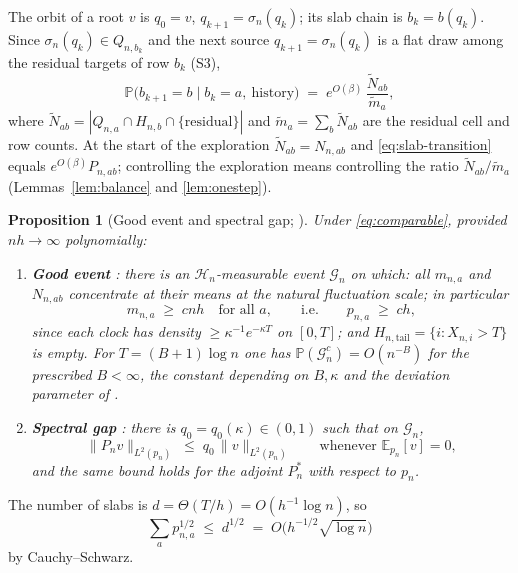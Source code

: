 \documentclass[11pt]{article}
\newcommand{\E}{\mathbb{E}}
\newcommand{\Prob}{\mathbb{P}}
\newcommand{\1}{\mathbf{1}}
\newcommand{\cG}{\mathcal{G}}
\newcommand{\cH}{\mathcal{H}}
\newtheorem{proposition}[theorem]{Proposition}
\theoremstyle{remark}
\begin{document}
The orbit of a root $v$ is $q_0=v$, $q_{k+1}=\sigma_n(q_k)$; its slab chain
is $b_k=b(q_k)$. Since $\sigma_n(q_k)\in Q_{n,b_k}$ and the next source
$q_{k+1}=\sigma_n(q_k)$ is a flat draw among the residual targets
of row $b_k$ (S3),
\begin{equation}\label{eq:slab-transition}
\Prob\bigl(b_{k+1}=b\mid b_k=a,\ \text{history}\bigr)
\;=\;e^{O(\beta)}\,\frac{\widetilde N_{ab}}{\widetilde m_a},
\end{equation}
where $\widetilde N_{ab}=|Q_{n,a}\cap H_{n,b}\cap\{\text{residual}\}|$ and
$\widetilde m_a=\sum_b\widetilde N_{ab}$ are the residual cell and row
counts. At the start of the exploration $\widetilde N_{ab}=N_{n,ab}$ and
\eqref{eq:slab-transition} equals $e^{O(\beta)}P_{n,ab}$; controlling the
exploration means controlling the ratio $\widetilde N_{ab}/\widetilde m_a$
(Lemmas~\ref{lem:balance} and \ref{lem:onestep}).

\begin{proposition}[Good event and spectral gap; \cite{Lon26}]\label{prop:good}
Under \eqref{eq:comparable}, provided $nh\to\infty$ polynomially:
\begin{enumerate}[label=(\roman*)]
\item \textbf{Good event} \cite[Lemma~6.3]{Lon26}: there is an
$\cH_n$-measurable event $\cG_n$ on which: all $m_{n,a}$ and $N_{n,ab}$
concentrate at their means at the natural fluctuation scale; in particular
\begin{equation}\label{eq:pmin}
m_{n,a}\;\ge\;cnh\quad\text{for all }a,
\qquad\text{i.e.}\qquad p_{n,a}\;\ge\;ch,
\end{equation}
since each clock has density $\ge\kappa^{-1}e^{-\kappa T}$ on $[0,T]$; and
$H_{n,\mathrm{tail}}=\{i:X_{n,i}>T\}$ is empty. For $T=(B+1)\log n$ one has
$\Prob(\cG_n^c)=O(n^{-B})$ for the prescribed $B<\infty$, the constant
depending on $B,\kappa$ and the deviation parameter of
\cite[Lemma~6.3]{Lon26}.
\item \textbf{Spectral gap} \cite[Lemmas~6.2, 6.3]{Lon26}: there is
$q_0=q_0(\kappa)\in(0,1)$ such that on $\cG_n$,
\begin{equation}\label{eq:gap}
\|P_n v\|_{L^2(p_n)}\;\le\;q_0\,\|v\|_{L^2(p_n)}
\qquad\text{whenever }\E_{p_n}[v]=0,
\end{equation}
and the same bound holds for the adjoint $P_n^*$ with respect to $p_n$.
\end{enumerate}
\end{proposition}

The number of slabs is $d=\Theta(T/h)=O(h^{-1}\log n)$, so
\begin{equation}\label{eq:d-bound}
\sum_a p_{n,a}^{1/2}\;\le\;d^{1/2}\;=\;O\bigl(h^{-1/2}\sqrt{\log n}\bigr)
\end{equation}
by Cauchy--Schwarz.
\end{document}
